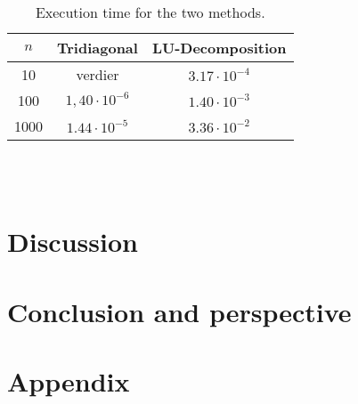 \documentclass{article}
\begin{document}
\fi






  \begin{table}[ht] \label{tab:exec_time}
    \centering
      \caption{Execution time for the two methods.}
      \vspace{2mm}
      \begin{tabular}{|c|c|c|}
        \hline
        $n$    &   Tridiagonal      &  LU-Decomposition  \\
        \hline \hline
        10   & verdier & $3.17\cdot10^{-4}$ \\
        100  & $1,40\cdot10^{-6}$ & $1.40\cdot10^{-3}$ \\
        1000 & $1.44\cdot10^{-5}$ & $3.36\cdot10^{-2}$ \\
        \hline
      \end{tabular} \\
      \hspace{0pt}\\
  \end{table}


\vspace{1cm}

\section{Discussion} \label{sec:Discussion}




\vspace{1cm}

\section{Conclusion and perspective} \label{sec:Conclusion}



\vspace{1cm}

\section{Appendix} \label{sec:Appendix}
\end{document}
